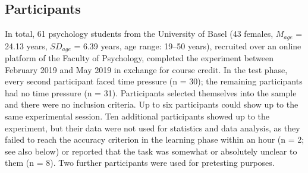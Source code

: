 \documentclass[a4paper,man,natbib]{apa6}
\begin{document}
\subsection{Participants}
In total, 61 psychology students from the University of Basel (43 females, $M_{age}$ = 24.13 years, $SD_{age}$ = 6.39 years, age range: 19--50 years), recruited over an online platform of the Faculty of Psychology, completed the experiment between February 2019 and May 2019 in exchange for course credit. In the test phase, every second participant faced time pressure (n = 30); the remaining participants had no time pressure (n = 31).
Participants selected themselves into the sample and there were no inclusion criteria. Up to six participants could show up to the same experimental session. Ten additional participants showed up to the experiment, but their data were not used for statistics and data analysis, as they failed to reach the accuracy criterion in the learning phase within an hour (n = 2; see also below) or reported that the task was somewhat or absolutely unclear to them (n = 8). Two further participants were used for pretesting purposes. 
\end{document}
